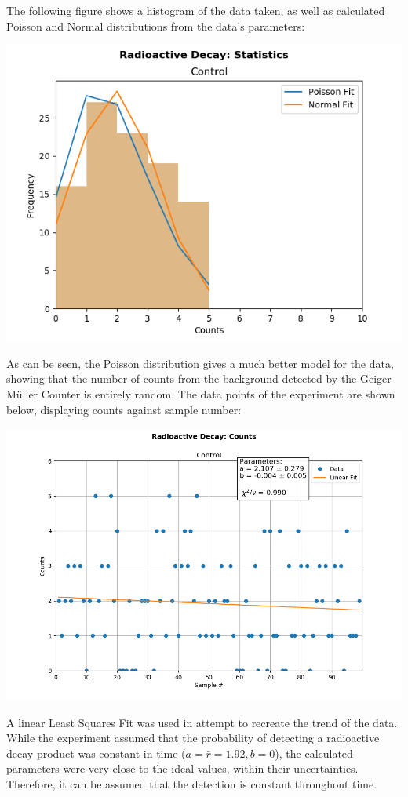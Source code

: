 \documentclass[twocolumn]{article}
\begin{document}
 The following figure shows a histogram of the data taken, as well as calculated Poisson and Normal distributions from the data's parameters:
 \centerline{\includegraphics[scale = 0.6]{fig3a}}
 
 As can be seen, the Poisson distribution gives a much better model for the data, showing that the number of counts from the background detected by 
 the Geiger-Müller Counter is entirely random.
 \vfill\eject
 The data points of the experiment are shown below, displaying counts against sample number:
 \centerline{\includegraphics[scale = 0.41]{fig3b}}
 A linear Least Squares Fit was used in attempt to recreate the trend of the data. While the experiment assumed that the probability of detecting a
 radioactive decay product was constant in time ($a = \bar{r} = 1.92 , b = 0$), the calculated parameters were very close to the ideal values, within their uncertainties.
 Therefore, it can be assumed that the detection is constant throughout time.
\end{document}
